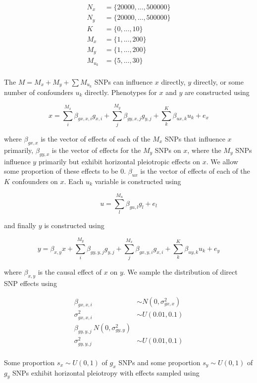 \documentclass[]{article}
\begin{document}
\[
\begin{aligned}
N_x & = \{20000, ..., 500000\} \\
N_y & = \{20000, ..., 500000\} \\
K & = \{0, ..., 10\} \\
M_x & = \{1, ..., 200\} \\
M_y & = \{1, ..., 200\} \\
M_{u_k} & = \{5,..., 30\} \\
\end{aligned}
\]

The \(M = M_x + M_y + \sum{M_{u_k}}\) SNPs can influence \(x\) directly,
\(y\) directly, or some number of confounders \(u_{k}\) directly.
Phenotypes for \(x\) and \(y\) are constructed using

\[
x = \sum^{M_x}_{i}{\beta_{gx,x,i}g_{x,i}} + \sum^{M_y}_{j}{\beta_{gy,x,j}g_{y,j}} + \sum^{K}_{k}{\beta_{ux,k} u_{k}} + e_{x}
\]

where \(\beta_{gx,x}\) is the vector of effects of each of the \(M_x\)
SNPs that influence \(x\) primarily, \(\beta_{gy,x}\) is the vector of
effects for the \(M_y\) SNPs on \(x\), where the \(M_y\) SNPs influence
\(y\) primarily but exhibit horizontal pleiotropic effects on \(x\). We
allow some proportion of these effects to be 0. \(\beta_{ux}\) is the
vector of effects of each of the \(K\) confounders on \(x\). Each
\(u_{k}\) variable is constructed using

\[
u = \sum^{M_u}_{l}{\beta_{gu,l}g_{l}} + e_{l}
\]

and finally \(y\) is constructed using

\[
y = \beta_{x,y}x + \sum^{M_y}_{i}{\beta_{gy,y,j}g_{y,j}} + \sum^{M_x}_{j}{\beta_{gx,y,i}g_{x,i}} + \sum^{K}_{k}{\beta_{uy,k} u_{k}} + e_{y}
\]

where \(\beta_{x,y}\) is the causal effect of \(x\) on \(y\). We sample
the distribution of direct SNP effects using

\[
\begin{aligned}
\beta_{gx,x,i} & \sim N(0, \sigma^2_{gx,x}) \\
\sigma^2_{gx,x,i} & \sim U(0.01, 0.1) \\
\beta_{gy,y,j} ~ N(0, \sigma^2_{gy,y}) \\
\sigma^2_{gy,y,j} & \sim U(0.01, 0.1) \\
\end{aligned}
\]

Some proportion \(s_x \sim U(0,1)\) of \(g_x\) SNPs and some proportion
\(s_y \sim U(0,1)\) of \(g_y\) SNPs exhibit horizontal pleiotropy with
effects sampled using
\end{document}
